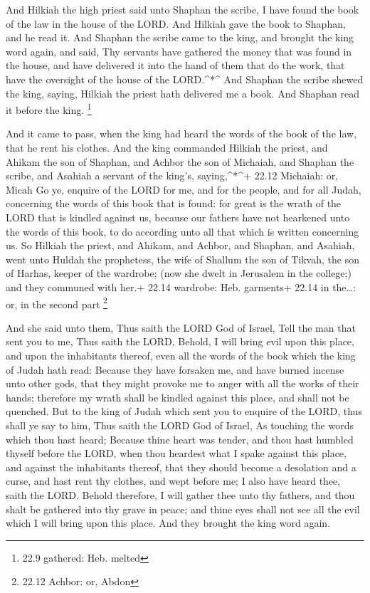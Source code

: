  And Hilkiah the high priest said unto Shaphan the scribe, I
have found the book of the law in the house of the LORD. And Hilkiah
gave the book to Shaphan, and he read it.  And Shaphan the
scribe came to the king, and brought the king word again, and said, Thy
servants have gathered the money that was found in the house, and have
delivered it into the hand of them that do the work, that have the
oversight of the house of the LORD.\^{}*\^{}  And Shaphan
the scribe shewed the king, saying, Hilkiah the priest hath delivered me
a book. And Shaphan read it before the king. \footnote{22.9 gathered:
  Heb. melted}

 And it came to pass, when the king had heard the words of
the book of the law, that he rent his clothes.  And the
king commanded Hilkiah the priest, and Ahikam the son of Shaphan, and
Achbor the son of Michaiah, and Shaphan the scribe, and Asahiah a
servant of the king's, saying,\^{}*\^{}+ 22.12 Michaiah: or, Micah
 Go ye, enquire of the LORD for me, and for the people, and
for all Judah, concerning the words of this book that is found: for
great is the wrath of the LORD that is kindled against us, because our
fathers have not hearkened unto the words of this book, to do according
unto all that which is written concerning us.  So Hilkiah
the priest, and Ahikam, and Achbor, and Shaphan, and Asahiah, went unto
Huldah the prophetess, the wife of Shallum the son of Tikvah, the son of
Harhas, keeper of the wardrobe; (now she dwelt in Jerusalem in the
college;) and they communed with her.+ 22.14 wardrobe: Heb. garments+
22.14 in the\ldots: or, in the second part \footnote{22.12 Achbor: or,
  Abdon}

 And she said unto them, Thus saith the LORD God of Israel,
Tell the man that sent you to me,  Thus saith the LORD,
Behold, I will bring evil upon this place, and upon the inhabitants
thereof, even all the words of the book which the king of Judah hath
read:  Because they have forsaken me, and have burned
incense unto other gods, that they might provoke me to anger with all
the works of their hands; therefore my wrath shall be kindled against
this place, and shall not be quenched.  But to the king of
Judah which sent you to enquire of the LORD, thus shall ye say to him,
Thus saith the LORD God of Israel, As touching the words which thou hast
heard;  Because thine heart was tender, and thou hast
humbled thyself before the LORD, when thou heardest what I spake against
this place, and against the inhabitants thereof, that they should become
a desolation and a curse, and hast rent thy clothes, and wept before me;
I also have heard thee, saith the LORD.  Behold therefore,
I will gather thee unto thy fathers, and thou shalt be gathered into thy
grave in peace; and thine eyes shall not see all the evil which I will
bring upon this place. And they brought the king word again.

